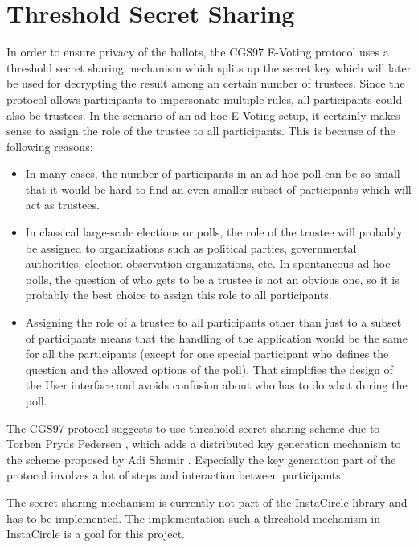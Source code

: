 \documentclass[numbers=noenddot, abstract=on]{scrreprt}
\begin{document}
\section{Threshold Secret Sharing}
\label{sec:thresholdsecretsharing}
In order to ensure privacy of the ballots, the CGS97 \cite{CGS97} E-Voting
protocol uses a threshold secret sharing mechanism which splits up the secret
key which will later be used for decrypting the result among an certain number
of trustees. Since the protocol allows participants to impersonate multiple
rules, all participants could also be trustees. In the scenario of an ad-hoc
E-Voting setup, it certainly makes sense to assign the role of the trustee to
all participants. This is because of the following reasons:
\begin{itemize}
  \item In many cases, the number of participants in an ad-hoc poll can be so
  small that it would be hard to find an even smaller subset of participants
  which will act as trustees.
  \item In classical large-scale elections or polls, the role of the trustee
  will probably be assigned to organizations such as political parties,
  governmental authorities, election observation organizations, etc. In
  spontaneous ad-hoc polls, the question of who gets to be a trustee is not an
  obvious one, so it is probably the best choice to assign this role to all
  participants.
  \item Assigning the role of a trustee to all participants other than just to a
  subset of participants means that the handling of the application would be the
  same for all the participants (except for one special participant who defines
  the question and the allowed options of the poll). That simplifies the design
  of the User interface and avoids confusion about who has to do what during the
  poll.
\end{itemize}

The CGS97 protocol suggests to use threshold secret sharing scheme due to Torben
Pryds Pedersen \cite{PED91}, which adds a distributed key generation mechanism to the
scheme proposed by Adi Shamir \cite{Shamir79}. Especially the key generation
part of the protocol involves a lot of steps and interaction between participants.

The secret sharing mechanism is currently not part of the InstaCircle library
and has to be implemented. The implementation such a threshold mechanism in
InstaCircle is a goal for this project.
\end{document}

